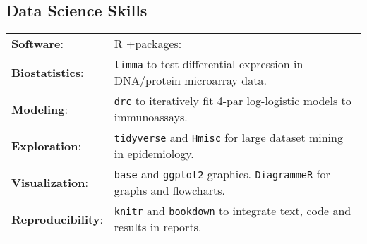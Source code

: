 \documentclass[margin,line]{res}
\begin{document}
\begin{resume}
\section{\sc Data Science Skills}%
\begin{tabular}{ l l }
	{\bf Software}: &  R +packages:\\ %
	{\bf Biostatistics}: & \texttt{limma} to test differential expression in DNA/protein microarray data.\\ %
	{\bf Modeling}: & \texttt{drc} to iteratively fit 4-par log-logistic models to immunoassays.\\
	{\bf Exploration}: & \texttt{tidyverse} and \texttt{Hmisc} for large dataset mining in epidemiology.\\
	{\bf Visualization}: & \texttt{base} and \texttt{ggplot2} graphics. \texttt{DiagrammeR} for graphs and flowcharts.\\ 
	{\bf Reproducibility}: & \texttt{knitr} and \texttt{bookdown} to integrate text, code and results in reports.
\end{tabular}


\end{resume}
\end{document}
